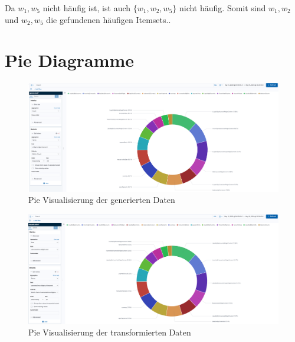 \newline
\newline
Da $w_1, w_5$ nicht häufig ist, ist auch $\{w_1,w_2,w_5\}$ nicht häufig. Somit sind $w_1,w_2$ und $w_2,w_5$ die gefundenen häufigen Itemsets..


\clearpage

\section{Pie Diagramme}
\label{anhang:zusatz2}
\begin{figure}[htb]
\begin{center}
	\includegraphics[width=430pt]{bilder/generated-pie.png}
\end{center}
\caption{Pie Visualisierung der generierten Daten}
\label{fig:generated-pie}
\end{figure}

\begin{figure}[htb]
\begin{center}
	\includegraphics[width=430pt]{bilder/transformed-pie.png}
\end{center}
\caption{Pie Visualisierung der transformierten Daten}
\label{fig:transformed-pie}
\end{figure}



\clearpage

